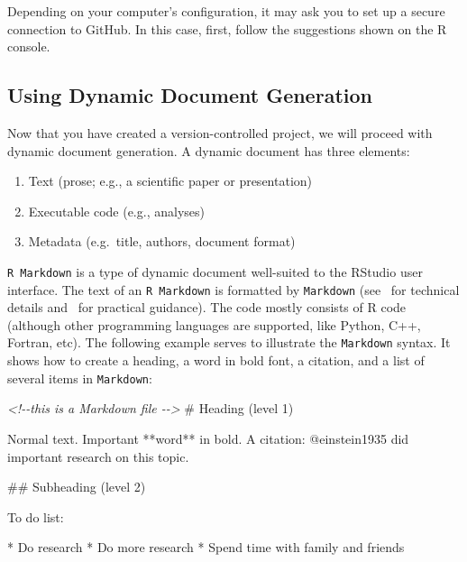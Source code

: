 \documentclass[psych,tutorial,accept,moreauthors,pdftex]{Definitions/mdpi}
\newenvironment{Shaded}{\begin{snugshade}}{\end{snugshade}}
\newcommand{\CommentTok}[1]{\textcolor[rgb]{0.56,0.35,0.01}{\textit{#1}}}
\newcommand{\FunctionTok}[1]{\textcolor[rgb]{0.00,0.00,0.00}{#1}}
\newcommand{\NormalTok}[1]{#1}
\newcommand{\SpecialStringTok}[1]{\textcolor[rgb]{0.31,0.60,0.02}{#1}}
\begin{document}
\begin{paracol}{2}
Depending on your computer's configuration, it may ask you to set up a
secure connection to GitHub. In this case, first, follow the suggestions
shown on the R console.

\subsection{Using Dynamic Document
Generation}\label{using-dynamic-document-generation}

Now that you have created a version-controlled project, we will proceed
with dynamic document generation. A dynamic document has three elements:

\begin{enumerate}
\def\labelenumi{\arabic{enumi}.}
\item
  Text (prose; e.g., a scientific paper or presentation)
\item
  Executable code (e.g., analyses)
\item
  Metadata (e.g.~title, authors, document format)
\end{enumerate}

\texttt{R\ Markdown} is a type of dynamic document well-suited to the
RStudio user interface. The text of an \texttt{R\ Markdown} is formatted
by \texttt{Markdown} (see~\citep{xieMarkdownDefinitiveGuide2019} for
technical details and~\citep{xieMarkdownCookbook2020} for practical
guidance). The code mostly consists of R code (although other
programming languages are supported, like Python, C++, Fortran, etc).
The following example serves to illustrate the \texttt{Markdown} syntax.
It shows how to create a heading, a word in bold font, a citation, and a
list of several items in \texttt{Markdown}:


\begin{adjustwidth}{0.5cm}{0cm} 
\begin{Shaded}
\begin{Highlighting}[]
\CommentTok{\textless{}!{-}{-}this is a Markdown file {-}{-}\textgreater{}}
\FunctionTok{\# Heading (level 1)}

\NormalTok{Normal text.}
\NormalTok{Important **word** in bold.}
\NormalTok{A citation: @einstein1935 did important research on this topic.}

\FunctionTok{\#\# Subheading (level 2)}

\NormalTok{To do list:}

\SpecialStringTok{* }\NormalTok{Do research}
\SpecialStringTok{* }\NormalTok{Do more research}
\SpecialStringTok{* }\NormalTok{Spend time with family and friends}
\end{Highlighting}
\end{Shaded}
\end{adjustwidth}


\end{paracol}
\end{document}
